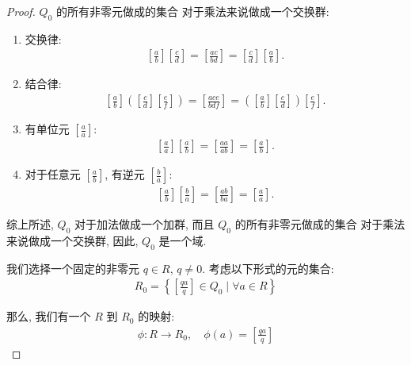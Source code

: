 \documentclass[utf8]{ctexbook}
\begin{document}
\begin{proof}
$Q_0$ 的所有非零元做成的集合 对于乘法来说做成一个交换群:
\begin{enumerate}
\item{交换律:
\begin{align*}
\left[ \frac{a}{b} \right] \left[ \frac{c}{d} \right] = \left[ \frac{ac }{bd} \right] = \left[ \frac{c}{d} \right] \left[ \frac{a}{b} \right] .
\end{align*}
}
\item{结合律:
\begin{align*}
\left[ \frac{a}{b} \right]  \left(\left[ \frac{c}{d} \right]  \left[ \frac{e}{f} \right]  \right) = \left[ \frac{ac e}{b d f} \right]  = \left( \left[ \frac{a}{b} \right]  \left[ \frac{c}{d} \right] \right) \left[ \frac{e}{f} \right] .
\end{align*}
}
\item{有单位元 $ \left[ \frac{a}{a} \right] $:
\begin{align*}
\left[ \frac{a}{a} \right] \left[ \frac{a}{b} \right] = \left[ \frac{aa }{ab} \right] = \left[ \frac{a}{b} \right] .
\end{align*}
}
\item{对于任意元 $\left[ \frac{a}{b} \right] $, 有逆元 $\left[ \frac{b}{a} \right] $:
\begin{align*}
\left[ \frac{a}{b} \right] \left[ \frac{b}{a} \right] = \left[ \frac{ab}{ba} \right] = \left[ \frac{a}{a} \right] .
\end{align*}
}
\end{enumerate}

综上所述, $Q_0$ 对于加法做成一个加群, 而且 $Q_0$ 的所有非零元做成的集合 对于乘法来说做成一个交换群, 因此, $Q_0$ 是一个域.

我们选择一个固定的非零元 $ q \in R$, $q \neq 0$. 考虑以下形式的元的集合:
\begin{align*}
R_0 = \left\{ \left[ \frac{q a}{q} \right] \in Q_0 \mid \forall a \in R  \right\} 
\end{align*} 

那么, 我们有一个 $R$ 到 $R_0$ 的映射:
\begin{align*}
\phi: R \longrightarrow R_0, \quad \phi(a) = \left[ \frac{q a}{q} \right]
\end{align*}


\end{proof}
\end{document}
